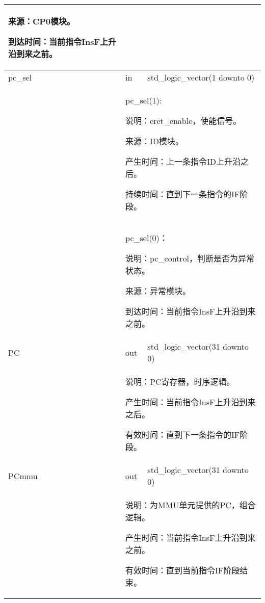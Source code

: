 \begin{tabularx}{\textwidth}{lll}
{                来源：CP0模块。

                到达时间：当前指令InsF上升沿到来之前。
            } \\
            \midrule
            pc\_sel         & in        & std\_logic\_vector(1 downto 0) \\
            \cmidrule(l){2-3}
            &
            \multicolumn{2}{X}{
                pc\_sel(1):

                    说明：eret\_enable，使能信号。

                    来源：ID模块。

                    产生时间：上一条指令ID上升沿之后。

                    持续时间：直到下一条指令的IF阶段。
            } \\
            &
            \multicolumn{2}{X}{
                pc\_sel(0)：

                    说明：pc\_control，判断是否为异常状态。

                    来源：异常模块。

                    到达时间：当前指令InsF上升沿到来之前。
            } \\
            \midrule
            PC              & out       & std\_logic\_vector(31 downto 0) \\
            \cmidrule(l){2-3}
            &
            \multicolumn{2}{X}{
                说明：PC寄存器，时序逻辑。

                产生时间：当前指令InsF上升沿到来之后。

                有效时间：直到下一条指令的IF阶段。
            } \\
            \midrule
            PCmmu           & out       & std\_logic\_vector(31 downto 0) \\
            \cmidrule(l){2-3}
            &
            \multicolumn{2}{X}{
                说明：为MMU单元提供的PC，组合逻辑。

                产生时间：当前指令InsF上升沿到来之前。

                有效时间：直到当前指令IF阶段结束。
            } \\
            \bottomrule
        \end{tabularx}
